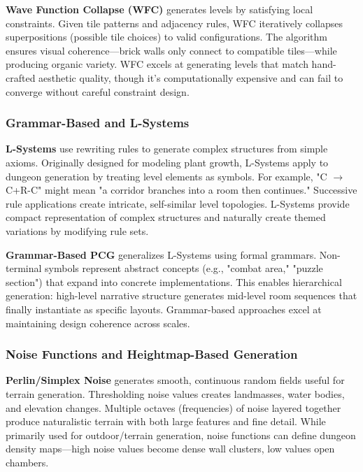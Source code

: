 \documentclass[11pt]{article}
\begin{document}
\textbf{Wave Function Collapse (WFC)} generates levels by satisfying local constraints. Given tile patterns and adjacency rules, WFC iteratively collapses superpositions (possible tile choices) to valid configurations. The algorithm ensures visual coherence—brick walls only connect to compatible tiles—while producing organic variety. WFC excels at generating levels that match hand-crafted aesthetic quality, though it's computationally expensive and can fail to converge without careful constraint design.

\subsubsection{Grammar-Based and L-Systems}

\textbf{L-Systems} use rewriting rules to generate complex structures from simple axioms. Originally designed for modeling plant growth, L-Systems apply to dungeon generation by treating level elements as symbols. For example, "C $\rightarrow$ C+R-C" might mean "a corridor branches into a room then continues." Successive rule applications create intricate, self-similar level topologies. L-Systems provide compact representation of complex structures and naturally create themed variations by modifying rule sets.

\textbf{Grammar-Based PCG} generalizes L-Systems using formal grammars. Non-terminal symbols represent abstract concepts (e.g., "combat area," "puzzle section") that expand into concrete implementations. This enables hierarchical generation: high-level narrative structure generates mid-level room sequences that finally instantiate as specific layouts. Grammar-based approaches excel at maintaining design coherence across scales.

\subsubsection{Noise Functions and Heightmap-Based Generation}

\textbf{Perlin/Simplex Noise} generates smooth, continuous random fields useful for terrain generation. Thresholding noise values creates landmasses, water bodies, and elevation changes. Multiple octaves (frequencies) of noise layered together produce naturalistic terrain with both large features and fine detail. While primarily used for outdoor/terrain generation, noise functions can define dungeon density maps—high noise values become dense wall clusters, low values open chambers.
\end{document}
